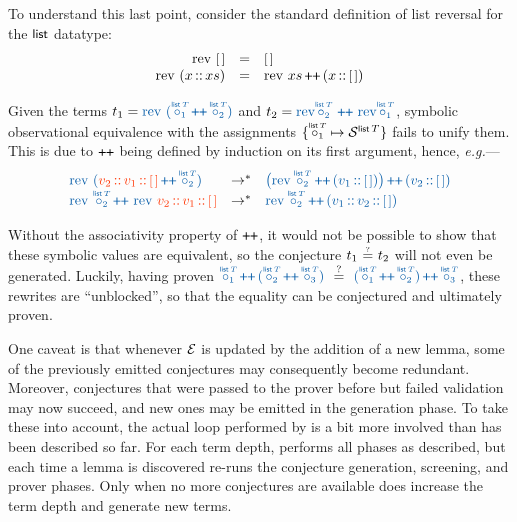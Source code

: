 \begin{example}\label{overview:lemma-seeding}
To understand this last point, consider the standard definition of list reversal for the $\tlist$ datatype:
\[
\begin{array}{rcl}
  \trev~\lnil & = & \lnil \\
  \trev~(x\cons xs) & = & \trev~xs \concat {(x\cons\lnil)}
\end{array}
\]

Given the terms $t_1 = {\clrterm \trev~({\pholder{1}{\tlist\,T}} \concat {\pholder{2}{\tlist\,T}})}$
and $t_2 = {\clrterm {\trev{\pholder{2}{\tlist\,T}}} \,\concat\, {\trev{\pholder{1}{\tlist\,T}}}}$,
symbolic observational equivalence with the assignments
$\{\pholder{1}{\tlist\,T} \mapsto \Symexes{\tlist\,T}\}$
fails to unify them.
This is due to $\concat$ being defined by induction on its first argument,
hence, \textit{e.g.}---
\[
\begin{array}{l@{\quad}c@{\quad}l}
 {\clrterm\trev~({\clrsymex v_2\cons v_1\cons\lnil}
   \concat \pholder{2}{\tlist\,T})} & \to^* &
 {\clrterm\big(\trev\pholder{2}{\tlist\,T} \concat 
   {(v_1\cons\lnil)}\big) \concat {(v_2\cons\lnil)}} \\
 {\clrterm {\trev~{\pholder{2}{\tlist\,T}}} \concat\,
  {\trev~{\clrsymex v_2\cons v_1\cons\lnil}}} & \to^* &
 {\clrterm\trev\pholder{2}{\tlist\,T} \concat 
   {(v_1\cons v_2\cons\lnil)}}
\end{array}
\]

Without the associativity property of $\concat$, it would not be possible to show that these symbolic values are equivalent, so the conjecture
$t_1\operatorname{\overset{\scriptscriptstyle ?}{\,=\,}} t_2$ will not even be generated.
Luckily, having proven
${\clrterm {\pholder{1}{\tlist\,T}} \concat 
   {(\pholder{2}{\tlist\,T} \concat \pholder{3}{\tlist\,T})}}
~\maybeEq~
 {\clrterm {({{\pholder{1}{\tlist\,T}} \concat 
   {\pholder{2}{\tlist\,T}})} \concat \pholder{3}{\tlist\,T}}}$,
these rewrites are ``unblocked'', so that the equality can be conjectured and ultimately proven.
\end{example}

One caveat is that whenever $\mathcal{E}$ is updated by the addition of a new lemma, some of the previously emitted conjectures may consequently become redundant.
Moreover, conjectures that were passed to the prover before but failed validation may now succeed, and new ones may be emitted in the generation phase.
To take these into account, the actual loop performed by \TheSy is a bit more involved than has been described so far.
For each term depth, \TheSy performs all phases as described, but each time a lemma is discovered \TheSy re-runs the conjecture generation, screening, and prover phases.
Only when no more conjectures are available does \TheSy increase the term depth and generate new terms.
